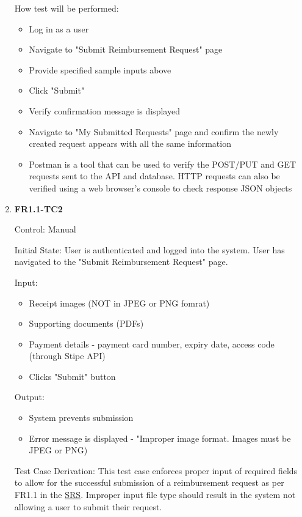 \documentclass[12pt, titlepage]{article}
\begin{document}
\begin{enumerate}
How test will be performed:
\begin{itemize}
    \item Log in as a user
    \item Navigate to "Submit Reimbursement Request" page
    \item Provide specified sample inputs above
    \item Click "Submit"
    \item Verify confirmation message is displayed
    \item Navigate to "My Submitted Requests" page and confirm the newly created request appears with all the same information
    \item Postman is a tool that can be used to verify the POST/PUT and GET requests sent to the API and database. HTTP requests can also be verified using a web browser's console to check response JSON objects
\end{itemize}
					
\item{\textbf{FR1.1-TC2}}

Control: Manual
					
Initial State: User is authenticated and logged into the system. User has navigated to the "Submit Reimbursement Request" page.
					
Input: 
\begin{itemize}
    \item Receipt images (NOT in JPEG or PNG fomrat)
    \item Supporting documents (PDFs)
    \item Payment details - payment card number, expiry date, access code (through Stipe API)
    \item Clicks "Submit" button
\end{itemize}
					
Output: 
\begin{itemize}
    \item System prevents submission
    \item Error message is displayed - "Improper image format. Images must be JPEG or PNG)
\end{itemize}

Test Case Derivation: This test case enforces proper input of required fields to allow for the successful submission of a reimbursement request as per FR1.1 in the \href{https://shorturl.at/FdAgR}{SRS}. Improper input file type should result in the system not allowing a user to submit their request.


\end{enumerate}
\end{document}
